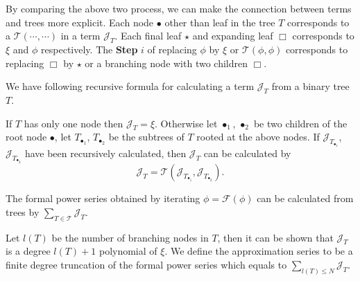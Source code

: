 \begin{itemize}
    
\end{itemize}


By comparing the above two process, we can make the connection between terms and trees more explicit. Each node $\bullet$ other than leaf in the tree $T$ corresponds to a $\mathcal{T}(\cdots,\cdots)$ in a term $\mathcal{J}_{T}$. Each final leaf $\star$ and expanding leaf $\Box$ corresponds to $\xi$ and $\phi$ respectively. The \textbf{Step} $i$ of replacing $\phi$ by $\xi$ or $\mathcal{T}(\phi,\phi)$ corresponds to replacing $\Box$ by $\star$ or a branching node with two children $\Box$.

We have following recursive formula for calculating a term $\mathcal{J}_T$ from a binary tree $T$. 

If $T$ has only one node then $\mathcal{J}_T=\xi$. Otherwise let $\bullet_1$, $\bullet_2$ be two children of the root node $\bullet$, let $T_{\bullet_1}$, $T_{\bullet_2}$ be the subtrees of $T$ rooted at the above nodes. If $\mathcal{J}_{T_{\bullet_1}}$, $\mathcal{J}_{T_{\bullet_2}}$ have been recursively calculated, then $\mathcal{J}_T$ can be calculated by
\begin{equation}\label{eq.treeterm'.threewave}
    \mathcal{J}_T=\mathcal{T}(\mathcal{J}_{T_{\bullet_1}}, \mathcal{J}_{T_{\bullet_2}}).
\end{equation}

The formal power series obtained by iterating $\phi=\mathcal{F}(\phi)$ can be calculated from trees by $\sum_{T\in \mathscr{T}} \mathcal{J}_T$.

Let $l(T)$ be the number of branching nodes in $T$, then it can be shown that $\mathcal{J}_T$ is a degree $l(T)+1$ polynomial of $\xi$. We define the approximation series to be a finite degree truncation of the formal power series which equals to $\sum_{l(T)\le N} \mathcal{J}_T$.


